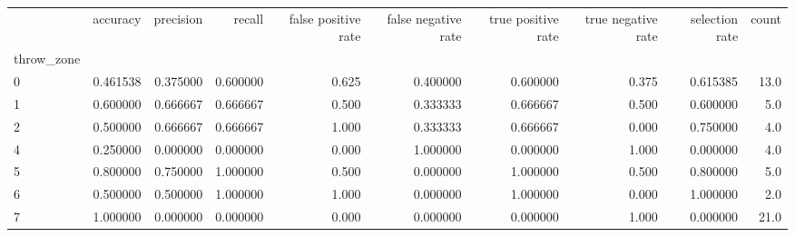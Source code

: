 \begin{tabular}{lrrrrrrrrr}
\toprule
{} &  accuracy &  precision &    recall &  false positive rate &  false negative rate &  true positive rate &  true negative rate &  selection rate &  count \\
throw\_zone &           &            &           &                      &                      &                     &                     &                 &        \\
\midrule
0          &  0.461538 &   0.375000 &  0.600000 &                0.625 &             0.400000 &            0.600000 &               0.375 &        0.615385 &   13.0 \\
1          &  0.600000 &   0.666667 &  0.666667 &                0.500 &             0.333333 &            0.666667 &               0.500 &        0.600000 &    5.0 \\
2          &  0.500000 &   0.666667 &  0.666667 &                1.000 &             0.333333 &            0.666667 &               0.000 &        0.750000 &    4.0 \\
4          &  0.250000 &   0.000000 &  0.000000 &                0.000 &             1.000000 &            0.000000 &               1.000 &        0.000000 &    4.0 \\
5          &  0.800000 &   0.750000 &  1.000000 &                0.500 &             0.000000 &            1.000000 &               0.500 &        0.800000 &    5.0 \\
6          &  0.500000 &   0.500000 &  1.000000 &                1.000 &             0.000000 &            1.000000 &               0.000 &        1.000000 &    2.0 \\
7          &  1.000000 &   0.000000 &  0.000000 &                0.000 &             0.000000 &            0.000000 &               1.000 &        0.000000 &   21.0 \\
\bottomrule
\end{tabular}
